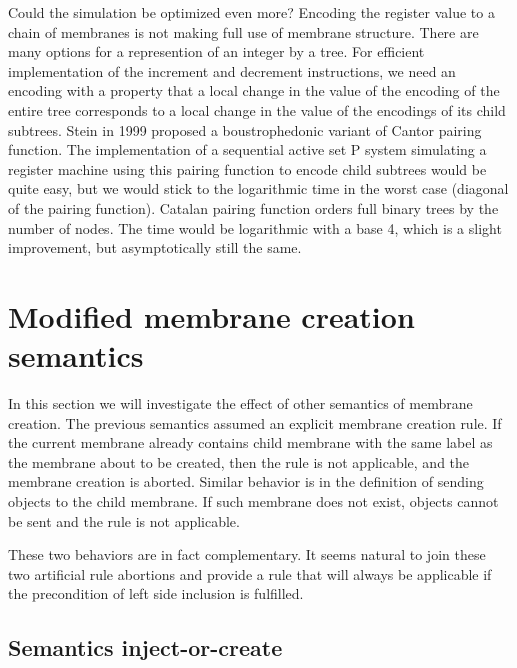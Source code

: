 \documentclass[llncs,submission,copyright,creativecommons]{../lib/lncs/llncs}
\begin{document}
Could the simulation be optimized even more? Encoding the register value to a chain of membranes is not making full use of membrane structure. There are many options for a represention of an integer by a tree. For efficient implementation of the increment and decrement instructions, we need an encoding with a property that a local change in the value of the encoding of the entire tree corresponds to a local change in the value of the encodings of its child subtrees. Stein in 1999 \cite{Stein99Plowing} proposed a boustrophedonic variant of Cantor pairing function. The implementation of a sequential active set P system simulating a register machine using this pairing function to encode child subtrees would be quite easy, but we would stick to the logarithmic time in the worst case (diagonal of the pairing function).
Catalan pairing function \cite{Stanley1986EnumerativeCombinatorics} orders full binary trees by the number of nodes. The time would be logarithmic with a base 4, which is a slight improvement, but asymptotically still the same.




\section{Modified membrane creation semantics} %
\label{sec:modified_membrane_creation_semantics}

In this section we will investigate the effect of other semantics of membrane creation. The previous semantics assumed an explicit membrane creation rule. If the current membrane already contains child membrane with the same label as the membrane about to be created, then the rule is not applicable, and the membrane creation is aborted. Similar behavior is in the definition of sending objects to the child membrane. If such membrane does not exist, objects cannot be sent and the rule is not applicable.

These two behaviors are in fact complementary. It seems natural to join these two artificial rule abortions and provide a rule that will always be applicable if the precondition of left side inclusion is fulfilled.

\subsection{Semantics inject-or-create} %
\label{sub:semantics_inject_or_create}
\end{document}
